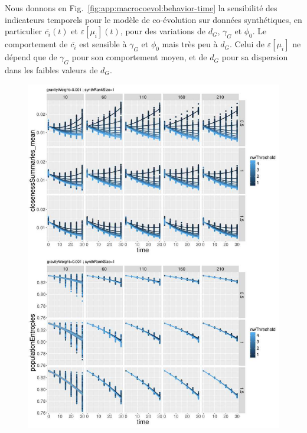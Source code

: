 Nous donnons en Fig.~\ref{fig:app:macrocoevol:behavior-time} la sensibilité des indicateurs temporels pour le modèle de co-évolution sur données synthétiques, en particulier $\bar{c_i}(t)$ et $\varepsilon\left[\mu_i\right](t)$, pour des variations de $d_G$, $\gamma_G$ et $\phi_0$. Le comportement de $\bar{c_i}$ est sensible à $\gamma_G$ et $\phi_0$ mais très peu à $d_G$. Celui de $\varepsilon\left[\mu_i\right]$ ne dépend que de $\gamma_G$ pour son comportement moyen, et de $d_G$ pour sa dispersion dans les faibles valeurs de $d_G$.


\begin{figure}
\includegraphics[width=\linewidth,height=0.9\textheight]{Figures/Final/A-macrocoevol-behavior-time.jpg}
\end{figure}




